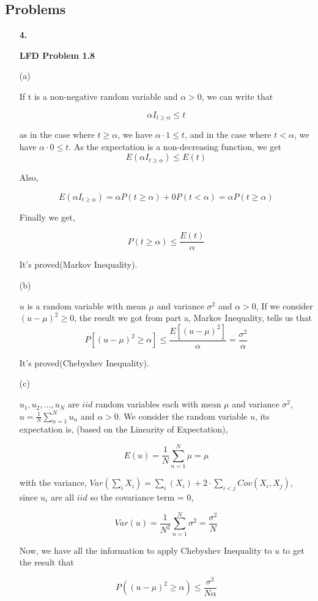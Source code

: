 \documentclass[11pt]{article}
\begin{document}
\subsection*{Problems}
\begin{enumerate}

\item[\textbf{4.}]

\textbf{LFD Problem 1.8}

(a)

If t is a non-negative random variable and $\alpha > 0$, we can write that

$$\alpha I_{ t \geq \alpha} \leq t$$

as in the case where $t \geq \alpha$, we have $\alpha \cdot 1 \leq t$, and in the case where $t < \alpha$, we have $\alpha \cdot 0 \leq t$. As the expectation is a non-decreasing function, we get $$ E(\alpha I_{t\geq \alpha}) \leq E(t)$$

Also, 

$$E(\alpha I_{t\geq \alpha}) = \alpha P(t\geq \alpha) + 0 P(t<\alpha) = \alpha P(t\geq \alpha)$$

Finally we get, 

$$P(t \geq \alpha) \leq \frac{E(t)}{\alpha}$$

It's proved(Markov Inequality).

(b)

$u$ is a random variable with mean $\mu$ and variance $\sigma^2$ and $\alpha > 0$, If we consider $(u-\mu)^2\geq 0$, the result we got from part a, Markov Inequality, tells us that 
$$P[(u-\mu)^2\geq\alpha] \leq\frac{E[(u-\mu)^2]}{\alpha} = \frac{\sigma^2}{\alpha}$$

It's proved(Chebyshev Inequality).

(c)

$u_1, u_2, ..., u_N$ are $iid$ random variables each with mean $\mu$ and variance $\sigma^2$, $u = \frac{1}{N}\sum_{n=1}^{N} u_n$ and $\alpha > 0$. We consider the random variable $u$, its expectation is, (based on the Linearity of Expectation),

$$E(u) = \frac{1}{N}\sum_{n=1}^{N} \mu = \mu$$

with the variance, $Var(\sum_{i}X_i) = \sum_{i}(X_i) + 2\cdot \sum_{i<j}Cov(X_i,X_j)$, since $u_i$ are all $iid$ so the covariance term = 0, 

$$Var(u) = \frac{1}{N^2}\sum_{n=1}^{N} \sigma^2 = \frac{\sigma^2}{N}$$

Now, we have all the information to apply Chebyshev Inequality to $u$ to get the result that 

$$P((u-\mu)^2 \geq \alpha) \leq \frac{\sigma^2}{N\alpha}$$

\end{enumerate}
\pagebreak
\end{document}
